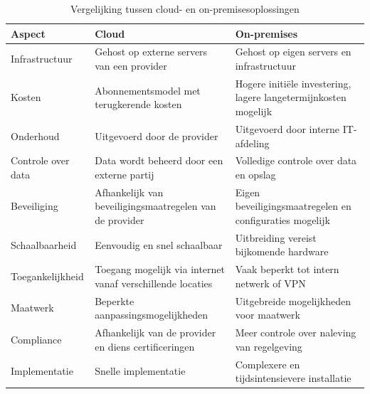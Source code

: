 \begin{table}[H]
    \centering
    \begin{tabular}{|p{4cm}|p{5cm}|p{5cm}|}
        \hline
        \textbf{Aspect} & \textbf{Cloud} & \textbf{On-premises} \\ \hline
        
        Infrastructuur &
        Gehost op externe servers van een provider &
        Gehost op eigen servers en infrastructuur \\ \hline
        
        Kosten &
        Abonnementsmodel met terugkerende kosten &
        Hogere initiële investering, lagere langetermijnkosten mogelijk \\ \hline
        
        Onderhoud &
        Uitgevoerd door de provider &
        Uitgevoerd door interne IT-afdeling \\ \hline
        
        Controle over data &
        Data wordt beheerd door een externe partij &
        Volledige controle over data en opslag \\ \hline
        
        Beveiliging &
        Afhankelijk van beveiligingsmaatregelen van de provider &
        Eigen beveiligingsmaatregelen en configuraties mogelijk \\ \hline
        
        Schaalbaarheid &
        Eenvoudig en snel schaalbaar &
        Uitbreiding vereist bijkomende hardware \\ \hline
        
        Toegankelijkheid &
        Toegang mogelijk via internet vanaf verschillende locaties &
        Vaak beperkt tot intern netwerk of VPN \\ \hline
        
        Maatwerk &
        Beperkte aanpassingsmogelijkheden &
        Uitgebreide mogelijkheden voor maatwerk \\ \hline
        
        Compliance &
        Afhankelijk van de provider en diens certificeringen &
        Meer controle over naleving van regelgeving \\ \hline
        
        Implementatie &
        Snelle implementatie &
        Complexere en tijdsintensievere installatie \\ \hline
        
    \end{tabular}
    \caption{Vergelijking tussen cloud- en on-premisesoplossingen}
    \label{tab:cloud_onprem}
\end{table}

